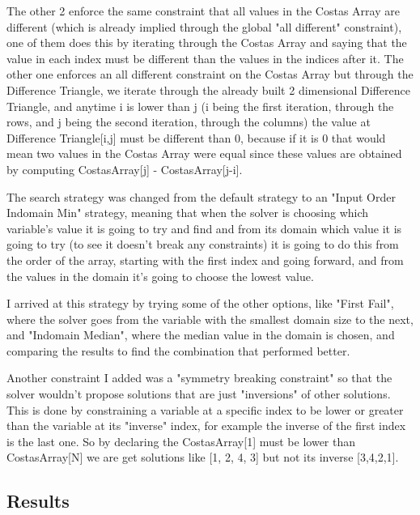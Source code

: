 \documentclass[runningheads]{llncs}
\begin{document}
The other 2 enforce the same constraint that all values in the Costas Array are different (which is already implied through the global "all different" constraint), one of them does this by iterating through the Costas Array and saying that the value in each index must be different than the values in the indices after it.
The other one enforces an all different constraint on the Costas Array but through the Difference Triangle, we iterate through the already built 2 dimensional Difference Triangle, and anytime i is lower than j (i being the first iteration, through the rows, and j being the second iteration, through the columns) the value at Difference Triangle[i,j] must be different than 0, because if it is 0 that would mean two values in the Costas Array were equal since these values are obtained by computing CostasArray[j] - CostasArray[j-i].

The search strategy was changed from the default strategy to an "Input Order Indomain Min" strategy, meaning that when the solver is choosing which variable's value it is going to try and find and from its domain which value it is going to try (to see it doesn't break any constraints) it is going to do this from the order of the array, starting with the first index and going forward, and from the values in the domain it's going to choose the lowest value.

I arrived at this strategy by trying some of the other options, like "First Fail", where the solver goes from the variable with the smallest domain size to the next, and "Indomain Median", where the median value in the domain is chosen, and comparing the results to find the combination that performed better.

Another constraint I added was a "symmetry breaking constraint" so that the solver wouldn't propose solutions that are just "inversions" of other solutions. This is done by constraining a variable at a specific index to be lower or greater than the variable at its "inverse" index, for example the inverse of the first index is the last one. So by declaring the CostasArray[1] must be lower than CostasArray[N] we are get solutions like [1, 2, 4, 3] but not its inverse [3,4,2,1].

\subsection{Results}
\end{document}
